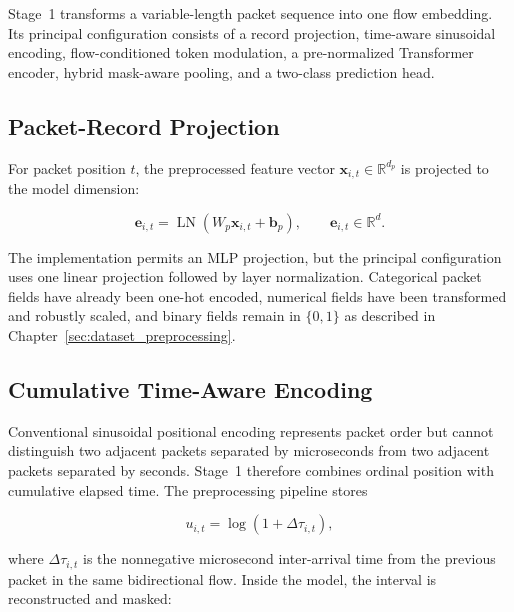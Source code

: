 \documentclass[11pt,fleqn]{report}
\begin{document}
Stage~1 transforms a variable-length packet sequence into one flow embedding.
Its principal configuration consists of a record projection, time-aware
sinusoidal encoding, flow-conditioned token modulation, a pre-normalized
Transformer encoder, hybrid mask-aware pooling, and a two-class prediction
head.

\subsection{Packet-Record Projection}
\label{subsubsec:packet_projection}

For packet position $t$, the preprocessed feature vector
$\mathbf{x}_{i,t}\in\mathbb{R}^{d_p}$ is projected to the model dimension:

\begin{equation}
    \mathbf{e}_{i,t}
    =\operatorname{LN}
    \left(W_p\mathbf{x}_{i,t}+\mathbf{b}_p\right),
    \qquad
    \mathbf{e}_{i,t}\in\mathbb{R}^{d}.
    \label{eq:record_projection}
\end{equation}

The implementation permits an MLP projection, but the principal configuration
uses one linear projection followed by layer normalization. Categorical packet
fields have already been one-hot encoded, numerical fields have been transformed
and robustly scaled, and binary fields remain in $\{0,1\}$ as described in
Chapter~\ref{sec:dataset_preprocessing}.

\subsection{Cumulative Time-Aware Encoding}
\label{subsubsec:time_aware_encoding}

Conventional sinusoidal positional encoding represents packet order but cannot
distinguish two adjacent packets separated by microseconds from two adjacent
packets separated by seconds. Stage~1 therefore combines ordinal position with
cumulative elapsed time. The preprocessing pipeline stores

\begin{equation}
    u_{i,t}=\log\left(1+\Delta\tau_{i,t}\right),
    \label{eq:stored_log_iat}
\end{equation}

where $\Delta\tau_{i,t}$ is the nonnegative microsecond inter-arrival time from
the previous packet in the same bidirectional flow. Inside the model, the
interval is reconstructed and masked:
\end{document}
